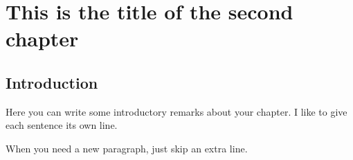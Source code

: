 	\chapter{This is the title of the second chapter}
	\newpage


\section{Introduction}

Here you can write some introductory remarks about your chapter.
I like to give each sentence its own line.

When you need a new paragraph, just skip an extra line.


\begin{comment}
	
	{}

	\begin{appendices}
	  \chapter{Appendix to Chapter 2}
	  
	\end{appendices}

	
\end{comment}
